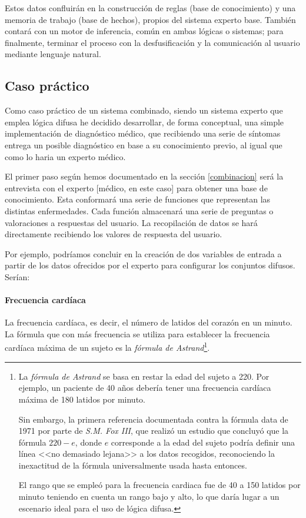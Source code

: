 \documentclass[a4paper, 11pt, titlepage]{article}
\begin{document}
    Estos datos confluirán en la construcción de reglas (base de conocimiento) y una memoria de trabajo 
    (base de hechos), propios del sistema experto base. También contará con un motor de inferencia, común 
    en ambas lógicas o sistemas; para finalmente, terminar el proceso con la desfusificación y la comunicación 
    al usuario mediante lenguaje natural.
    
    \subsection{Caso práctico}\label{casopractico}

        Como caso práctico de un sistema combinado, siendo un sistema experto que emplea lógica difusa he 
        decidido desarrollar, de forma conceptual, una simple implementación de diagnóstico médico, que 
        recibiendo una serie de síntomas entrega un posible diagnóstico en base a su conocimiento previo, al igual 
        que como lo haria un experto médico.

        El primer paso según hemos documentado en la sección \ref{combinacion} será la entrevista con el 
        experto [médico, en este caso] para obtener una base de conocimiento. Esta conformará una serie de 
        funciones que representan las distintas enfermedades. Cada función almacenará una serie de preguntas 
        o valoraciones a respuestas del usuario. La recopilación de datos se hará directamente recibiendo los 
        valores de respuesta del usuario.

        Por ejemplo, podríamos concluir en la creación de dos variables de entrada a partir de los datos 
        ofrecidos por el experto para configurar los conjuntos difusos. Serían:

        \paragraph{Frecuencia cardíaca} La frecuencia cardíaca, es decir, el número de latidos del corazón 
        en un minuto. La fórmula que con más frecuencia se utiliza para establecer la frecuencia cardíaca 
        máxima de un sujeto es la \textit{fórmula de Astrand}\footnote{
            La \textit{fórmula de Astrand} se basa en restar la edad del sujeto a 220. Por ejemplo, un 
            paciente de 40 años debería tener una frecuencia cardíaca máxima de 180 latidos por minuto.

            Sin embargo, la primera referencia documentada contra la fórmula data de 1971 por parte de 
            \textit{S.M. Fox III}, que realizó un estudio que concluyó que la fórmula $220-e$, donde $e$ 
            corresponde a la edad del sujeto podría definir una línea <<no demasiado lejana>> a los datos 
            recogidos, reconociendo la inexactitud de la fórmula universalmente usada hasta entonces. 
            
            El rango que se empleó para la frecuencia cardiaca fue de 40 a 150 latidos  
            por minuto teniendo en cuenta un rango bajo y alto, lo que daría lugar a un escenario ideal para el 
            uso de lógica difusa.
        }.
\end{document}
